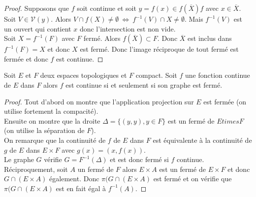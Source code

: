 \documentclass[10pt,a4paper]{article}
\begin{document}
  \begin{proof}
    Supposons que $f$ soit continue et soit $y=f(x) \in f(\overline{X})f$ avec $x \in \overline{X}$. Soit $V \in \mathcal{V}(y)$. Alors
    $V \cap f(X) \neq \emptyset \ \Leftrightarrow \ f^{-1}(V) \cap X \neq \emptyset$. Mais $f^{-1}(V)$ est un ouvert qui contient $x$ donc l'intersection est non vide.\\
    Soit $X = f^{-1}(F)$ avec $F$ fermé. Alors $f(\overline{X}) \subset F$. Donc $\overline{X}$ est inclus dans $f^{-1}(F)=X$ et donc $X$ est fermé. Donc l'image réciproque de tout fermé est fermée et donc $f$ est continue.
  \end{proof}
  \begin{prop}
    Soit $E$ et $F$ deux espaces topologiques et $F$ compact. Soit $f$ une fonction continue de $E$ dans $F$ alors $f$ est continue si et seulement si son graphe est fermé.
  \end{prop}
  \begin{proof}
    Tout d'abord on montre que l'application projection sur $E$ est fermée (on utilise fortement la compacité).\\
    Ensuite on montre que la droite $\Delta = \lbrace (y,y), y\in F \rbrace$ est un fermé de $E times F$ (on utilise la séparation de $F$).\\
    On remarque que la continuité de $f$ de $E$ dans $F$ est équivalente à la continuité de $g$ de $E$ dans $E \times F$ avec $g(x) = (x,f(x))$.\\
    Le graphe $G$ vérifie $G = F^{-1}(\Delta)$ et est donc fermé si $f$ continue. Réciproquement, soit $A$ un fermé de $F$ alors $E \times A$ est un fermé de $E \times F$ et donc $G \cap (E \times A)$ également. Donc $\pi(G \cap (E \times A)$ est fermé et on vérifie que $\pi(G \cap (E \times A)$ est en fait égal à $f^{-1}(A)$.
    
  \end{proof}
\end{document}
